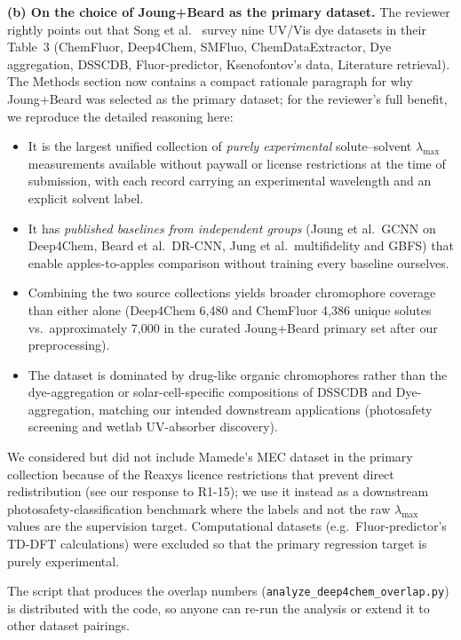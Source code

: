\documentclass[11pt]{article}
\begin{document}
{\textbf{(b) On the choice of Joung+Beard as the primary dataset.} The reviewer rightly points out that Song et al.~\cite{song2025fluortools} survey nine UV/Vis dye datasets in their Table~3 (ChemFluor, Deep4Chem, SMFluo, ChemDataExtractor, Dye aggregation, DSSCDB, Fluor-predictor, Ksenofontov's data, Literature retrieval). The Methods section now contains a compact rationale paragraph for why Joung+Beard was selected as the primary dataset; for the reviewer's full benefit, we reproduce the detailed reasoning here:
\begin{itemize}[leftmargin=2em,itemsep=2pt]
  \item It is the largest unified collection of \emph{purely experimental} solute--solvent $\lambda_{\max}$ measurements available without paywall or license restrictions at the time of submission, with each record carrying an experimental wavelength and an explicit solvent label.
  \item It has \emph{published baselines from independent groups} (Joung et al.\ GCNN on Deep4Chem, Beard et al.\ DR-CNN, Jung et al.\ multifidelity and GBFS) that enable apples-to-apples comparison without training every baseline ourselves.
  \item Combining the two source collections yields broader chromophore coverage than either alone (Deep4Chem 6{,}480 and ChemFluor 4{,}386 unique solutes vs.\ approximately 7{,}000 in the curated Joung+Beard primary set after our preprocessing).
  \item The dataset is dominated by drug-like organic chromophores rather than the dye-aggregation or solar-cell-specific compositions of DSSCDB and Dye-aggregation, matching our intended downstream applications (photosafety screening and wetlab UV-absorber discovery).
\end{itemize}
We considered but did not include Mamede's MEC dataset in the primary collection because of the Reaxys licence restrictions that prevent direct redistribution (see our response to R1-15); we use it instead as a downstream photosafety-classification benchmark where the labels and not the raw $\lambda_{\max}$ values are the supervision target. Computational datasets (e.g.\ Fluor-predictor's TD-DFT calculations) were excluded so that the primary regression target is purely experimental.

The script that produces the overlap numbers (\texttt{analyze\_deep4chem\_overlap.py}) is distributed with the code, so anyone can re-run the analysis or extend it to other dataset pairings.}
\end{document}
